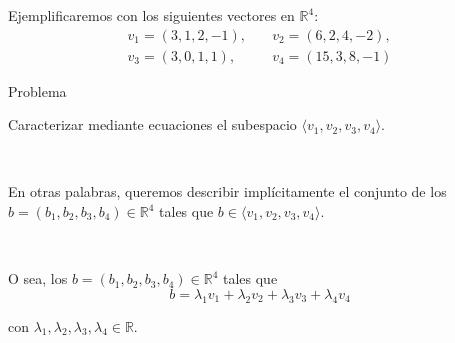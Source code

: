 \documentclass[handout]{beamer} %
\newcommand{\R}{\mathbb R}
\begin{document}
        
        \begin{frame}
        Ejemplificaremos con los siguientes vectores en $\R^4$:
        \begin{align*}
        v_1=(3,1,2,-1),&\quad
        v_2=(6,2,4,-2),\\
        v_3=(3,0,1,1),&\quad
        v_4=(15,3,8,-1)
        \end{align*}
        \pause

        \begin{exampleblock}{Problema}\pause
        
        Caracterizar mediante ecuaciones el subespacio $\langle v_1, v_2, v_3, v_4\rangle$.
       
        \pause
        
        \
        
        En otras palabras, queremos describir implícitamente el conjunto de los $b=(b_1,b_2,b_3,b_4)
        \in\R^4$ tales que $b\in\langle v_1, v_2, v_3, v_4\rangle$.
        
        \

        \pause
        O sea, los $b=(b_1,b_2,b_3,b_4)
        \in\R^4$ tales que 
        \begin{equation*}
            b=\lambda_1v_1+\lambda_2v_2+\lambda_3v_3+\lambda_4v_4 \tag{*}
        \end{equation*}
        
        
        con $\lambda_1,\lambda_2,\lambda_3,\lambda_4\in\R$.
        \end{exampleblock}
        \end{frame}
        
\end{document}
